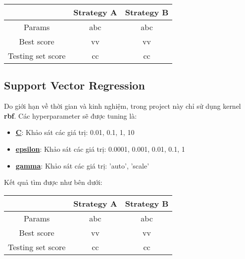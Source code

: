 \begin{table}[h!]
    \center
    \begin{tabular}{| c || c | c |}
    \hline
     & Strategy A & Strategy B \\
    \hline
    \hline
    Params & abc & abc \\
    Best score & vv & vv \\
    Testing set score & cc & cc \\
    \hline
    \end{tabular}
\end{table}


\subsection{Support Vector Regression}

Do giới hạn về thời gian và kinh nghiệm, trong project này chỉ sử dụng kernel \textbf{rbf}. Các hyperparameter sẽ được tuning là:

\begin{itemize}
\item \textbf{\underline{C}}: Khảo sát các giá trị: 0.01, 0.1, 1, 10

\item \textbf{\underline{epsilon}}: Khảo sát các giá trị: 0.0001, 0.001, 0.01, 0.1, 1

\item \textbf{\underline{gamma}}: Khảo sát các giá trị: 'auto', 'scale'
\end{itemize}

Kết quả tìm được như bên dưới:

\begin{table}[h!]
    \center
    \begin{tabular}{| c || c | c |}
    \hline
     & Strategy A & Strategy B \\
     \hline
    \hline
    Params & abc & abc \\
    Best score & vv & vv \\
    Testing set score & cc & cc \\
    \hline
    \end{tabular}
\end{table}